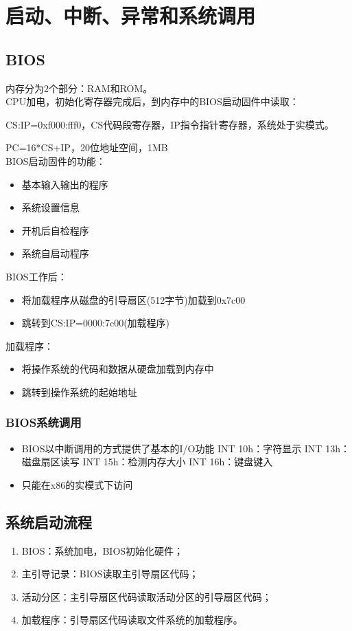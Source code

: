 \chapter{启动、中断、异常和系统调用}
\section{BIOS}
内存分为2个部分：RAM和ROM。\\
CPU加电，初始化寄存器完成后，到内存中的BIOS启动固件中读取：
\par 
CS:IP=0xf000:fff0，CS代码段寄存器，IP指令指针寄存器，系统处于实模式。
\par PC=16*CS+IP，20位地址空间，1MB\\
BIOS启动固件的功能：
\begin{itemize}
	\item 基本输入输出的程序
	\item 系统设置信息
	\item 开机后自检程序
	\item 系统自启动程序
\end{itemize}
BIOS工作后：
\begin{itemize}
	\item 将加载程序从磁盘的引导扇区(512字节)加载到0x7c00
	\item 跳转到CS:IP=0000:7c00(加载程序)
\end{itemize}
加载程序：
\begin{itemize}
	\item 将操作系统的代码和数据从硬盘加载到内存中
	\item 跳转到操作系统的起始地址
\end{itemize}
\subsection{BIOS系统调用}
\begin{itemize}
	\item BIOS以中断调用的方式提供了基本的I/O功能
	\subitem INT 10h：字符显示
	\subitem INT 13h：磁盘扇区读写
	\subitem INT 15h：检测内存大小
	\subitem INT 16h：键盘键入
	\item 只能在x86的实模式下访问
\end{itemize}

\section{系统启动流程}
\begin{enumerate}
	\item BIOS：系统加电，BIOS初始化硬件；
	\item 主引导记录：BIOS读取主引导扇区代码；
	\item 活动分区：主引导扇区代码读取活动分区的引导扇区代码；
	\item 加载程序：引导扇区代码读取文件系统的加载程序。
\end{enumerate}
